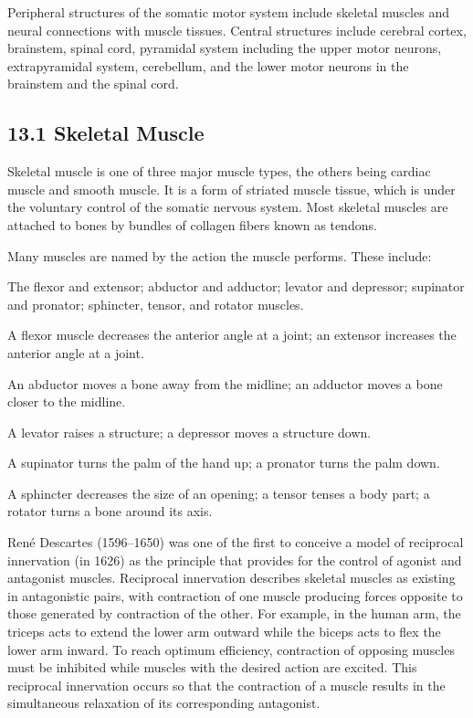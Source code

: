 Peripheral structures of the somatic motor system include skeletal
muscles and neural connections with muscle tissues. Central structures
include cerebral cortex, brainstem, spinal cord, pyramidal system
including the upper motor neurons, extrapyramidal system, cerebellum,
and the lower motor neurons in the brainstem and the spinal cord.

\hypertarget{skeletal-muscle}{%
\subsection{\texorpdfstring{{13.1} Skeletal
Muscle}{13.1 Skeletal Muscle}}\label{skeletal-muscle}}

Skeletal muscle is one of three major muscle types, the others being
cardiac muscle and smooth muscle. It is a form of striated muscle
tissue, which is under the voluntary control of the somatic nervous
system. Most skeletal muscles are attached to bones by bundles of
collagen fibers known as tendons.

Many muscles are named by the action the muscle performs. These include:

The flexor and extensor; abductor and adductor; levator and depressor;
supinator and pronator; sphincter, tensor, and rotator muscles.

A flexor muscle decreases the anterior angle at a joint; an extensor
increases the anterior angle at a joint.

An abductor moves a bone away from the midline; an adductor moves a bone
closer to the midline.

A levator raises a structure; a depressor moves a structure down.

A supinator turns the palm of the hand up; a pronator turns the palm
down.

A sphincter decreases the size of an opening; a tensor tenses a body
part; a rotator turns a bone around its axis.

René Descartes (1596--1650) was one of the first to conceive a model of
reciprocal innervation (in 1626) as the principle that provides for the
control of agonist and antagonist muscles. Reciprocal innervation
describes skeletal muscles as existing in antagonistic pairs, with
contraction of one muscle producing forces opposite to those generated
by contraction of the other. For example, in the human arm, the triceps
acts to extend the lower arm outward while the biceps acts to flex the
lower arm inward. To reach optimum efficiency, contraction of opposing
muscles must be inhibited while muscles with the desired action are
excited. This reciprocal innervation occurs so that the contraction of a
muscle results in the simultaneous relaxation of its corresponding
antagonist.

